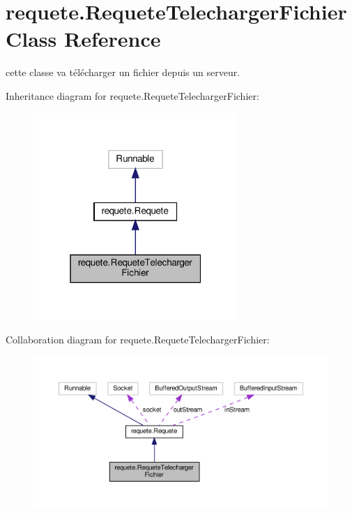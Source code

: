 \hypertarget{classrequete_1_1RequeteTelechargerFichier}{}\section{requete.\+Requete\+Telecharger\+Fichier Class Reference}
\label{classrequete_1_1RequeteTelechargerFichier}


cette classe va télécharger un fichier depuis un serveur.  




Inheritance diagram for requete.\+Requete\+Telecharger\+Fichier\+:
\nopagebreak
\begin{figure}[H]
\begin{center}
\leavevmode
\includegraphics[width=220pt]{classrequete_1_1RequeteTelechargerFichier__inherit__graph}
\end{center}
\end{figure}


Collaboration diagram for requete.\+Requete\+Telecharger\+Fichier\+:
\nopagebreak
\begin{figure}[H]
\begin{center}
\leavevmode
\includegraphics[width=350pt]{classrequete_1_1RequeteTelechargerFichier__coll__graph}
\end{center}
\end{figure}
